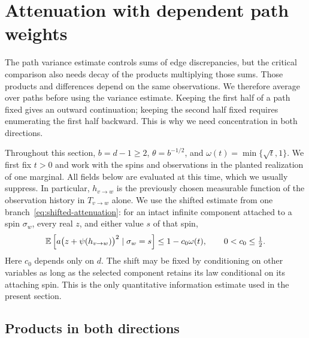 \section{Attenuation with dependent path weights}
\label{sec:path-averages}

The path variance estimate controls sums of edge discrepancies, but
the critical comparison also needs decay of the
products multiplying those sums.  Those products and differences depend
on the same observations.  We therefore average over paths
before using the variance estimate.  Keeping the first half of a path
fixed gives an outward continuation; keeping the second half fixed
requires enumerating the first half backward.  This is why we need
concentration in both directions.

Throughout this section, $b=d-1\ge2$, $\theta=b^{-1/2}$, and
$\omega(t)=\min\{\sqrt t,1\}$.  We first fix $t>0$ and work with the
spins and observations in the planted realization of one marginal.  All fields
below are evaluated at this time, which we usually suppress.  In
particular, $h_{v\to w}$ is the previously chosen measurable function
of the observation history in $T_{v\to w}$ alone.  We use the shifted
estimate from one branch~\eqref{eq:shifted-attenuation}: for an intact
infinite component attached to a spin $\sigma_w$, every real $z$, and
either value $s$ of that spin,
\begin{equation}
 \mathbb E\left[a\bigl(z+\psi(h_{v\to w})\bigr)^2
              \mid\sigma_w=s\right]\le1-c_0\omega(t),
 \qquad 0<c_0\le\tfrac12.
 \label{eq:path-shift-input}
\end{equation}
Here $c_0$ depends only on $d$.  The shift may be fixed by conditioning
on other variables as long as the selected component retains its law
conditional on its attaching spin.  This is the only quantitative
information estimate used in the present section.

\subsection{Products in both directions}

